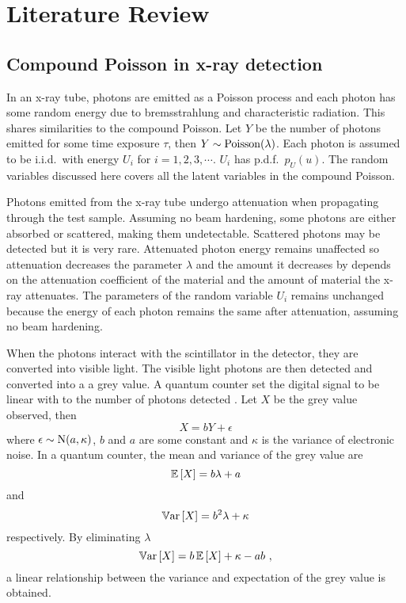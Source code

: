\section{Literature Review}

\subsection{Compound Poisson in x-ray detection}

In an x-ray tube, photons are emitted as a Poisson process and each photon has some random energy due to bremsstrahlung and characteristic radiation. This shares similarities to the compound Poisson. Let $Y$ be the number of photons emitted for some time exposure $\tau$, then $Y\sim\operatorname{Poisson}(\lambda)$. Each photon is assumed to be i.i.d.~with energy $U_i$ for $i=1,2,3,\cdots$. $U_i$ has p.d.f.~$p_U(u)$. The random variables discussed here covers all the latent variables in the compound Poisson.

Photons emitted from the x-ray tube undergo attenuation when propagating through the test sample. Assuming no beam hardening, some photons are either absorbed or scattered, making them undetectable. Scattered photons may be detected but it is very rare. Attenuated photon energy remains unaffected so attenuation decreases the parameter $\lambda$ and the amount it decreases by depends on the attenuation coefficient of the material and the amount of material the x-ray attenuates. The parameters of the random variable $U_i$ remains unchanged because the energy of each photon remains the same after attenuation, assuming no beam hardening.

When the photons interact with the scintillator in the detector, they are converted into visible light. The visible light photons are then detected and converted into a a grey value. A quantum counter set the digital signal to be linear with to the number of photons detected \citep{whiting2006properties}. Let $X$ be the grey value observed, then
\begin{equation}
X = bY + \epsilon
\end{equation}
where $\epsilon\sim\operatorname{N}(a,\kappa)$, $b$ and $a$ are some constant and $\kappa$ is the variance of electronic noise. In a quantum counter, the mean and variance of the grey value are
\begin{equation}
\operatorname{\mathbb{E}}\left[X\right] = b\lambda + a
\end{equation}
and
\begin{equation}
\operatorname{\mathbb{V}ar}\left[X\right] = b^2\lambda + \kappa
\end{equation}
respectively. By eliminating $\lambda$
\begin{equation}
\operatorname{\mathbb{V}ar}\left[X\right] = b\operatorname{\mathbb{E}}\left[X\right]+\kappa-ab \ ,
\end{equation}
a linear relationship between the variance and expectation of the grey value is obtained.

